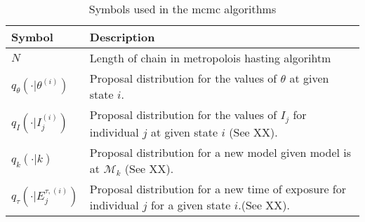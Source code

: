 \documentclass{article}
\begin{document}
\begin{table}[ht]
    \centering
    \begin{tabular}{| p{} | p{} |}
         \hline
        \textbf{Symbol} & \textbf{Description} \\ \hline
        $N$ & Length of chain in metropolois hasting algorihtm \\ \hline
       $ q_\theta\left(\cdot | \theta^{(i)}\right)$ & Proposal distribution for the values of $\theta$ at given state $i$. \\ \hline
       $ q_I\left(\cdot | I_j^{(i)}\right)$ & Proposal distribution for the values of $I_j$ for individual $j$ at given state $i$ (See XX). \\  \hline
       $ q_k\left(\cdot | k\right)$ & Proposal distribution for a new model given model is at $\mathcal{M}_k$ (See XX). \\  \hline
       $ q_\tau\left(\cdot | E_j^{\tau, (i)}\right)$ & Proposal distribution for a new time of exposure for individual $j$ for a given state $i$.(See XX). \\  \hline

    \end{tabular}
    \caption{Symbols used in the mcmc algorithms}
    \label{tab:mcmc_pars}
\end{table}
\end{document}
